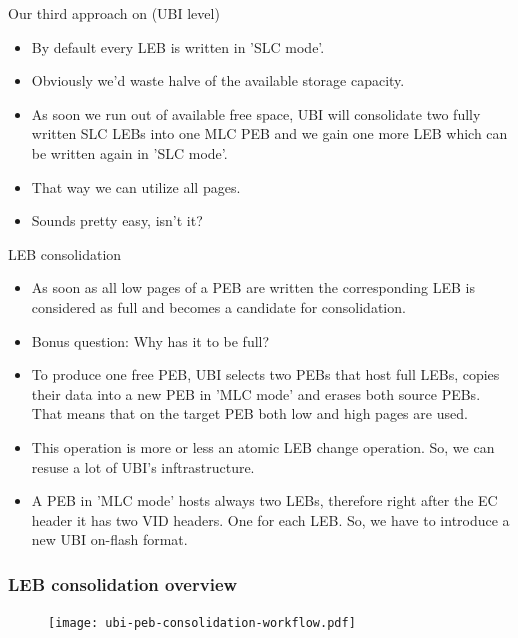 \documentclass[aspectratio=169,obeyspaces,spaces,hyphens,dvipsnames]{beamer}
\begin{document}
\begin{frame}{Our third approach on (UBI level)}
  \begin{itemize}
  \item By default every LEB is written in 'SLC mode'.
  \item Obviously we'd waste halve of the available storage capacity.
  \item As soon we run out of available free space, UBI will consolidate two fully written SLC LEBs
        into one MLC PEB and we gain one more LEB which can be written again in 'SLC mode'.
  \item That way we can utilize all pages.
  \item Sounds pretty easy, isn't it?
  \end{itemize}
\end{frame}

\begin{frame}{LEB consolidation}
  \begin{itemize}
  \item As soon as all low pages of a PEB are written the corresponding LEB is considered as full
        and becomes a candidate for consolidation.
  \item Bonus question: Why has it to be full?
  \item To produce one free PEB, UBI selects two PEBs that host full LEBs, copies their data
        into a new PEB in 'MLC mode' and erases both source PEBs.
        That means that on the target PEB both low and high pages
        are used.
  \item This operation is more or less an atomic LEB change operation. So, we can resuse a lot of
        UBI's inftrastructure.
  \item A PEB in 'MLC mode' hosts always two LEBs, therefore right after the EC header it has
        two VID headers. One for each LEB. So, we have to introduce a new UBI on-flash format.
  \end{itemize}
\end{frame}

\begin{frame}[fragile]
\frametitle{LEB consolidation overview}
     \begin{figure}
     \texttt{[image: ubi-peb-consolidation-workflow.pdf]}
     \end{figure}
\end{frame}
\end{document}

